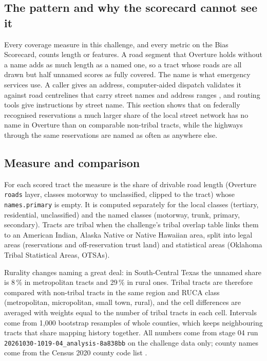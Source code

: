 \documentclass[11pt]{article}
\begin{document}
\subsection{The pattern and why the scorecard cannot see it}

Every coverage measure in this challenge, and every metric on the Bias
Scorecard, counts length or features. A road segment that Overture holds
without a name adds as much length as a named one, so a tract whose roads
are all drawn but half unnamed scores as fully covered. The name is what
emergency services use. A caller gives an address, computer-aided dispatch
validates it against road centrelines that carry street names and address
ranges \cite{nena006}, and routing tools give instructions by street name.
This section shows that on federally recognised reservations a much larger
share of the local street network has no name in Overture than on comparable
non-tribal tracts, while the highways through the same reservations are
named as often as anywhere else.

\subsection{Measure and comparison}

For each scored tract the measure is the share of drivable road length
(Overture \texttt{roads} layer, classes motorway to unclassified, clipped to
the tract) whose \texttt{names.primary} is empty. It is computed separately
for the local classes (tertiary, residential, unclassified) and the named
classes (motorway, trunk, primary, secondary). Tracts are tribal when the
challenge's tribal overlap table links them to an American Indian, Alaska
Native or Native Hawaiian area, split into legal areas (reservations and
off-reservation trust land) and statistical areas (Oklahoma Tribal
Statistical Areas, OTSAs).

Rurality changes naming a great deal: in South-Central Texas the unnamed
share is 8\,\% in metropolitan tracts and 29\,\% in rural ones. Tribal tracts
are therefore compared with non-tribal tracts in the same region and RUCA
class (metropolitan, micropolitan, small town, rural), and the cell
differences are averaged with weights equal to the number of tribal tracts
in each cell. Intervals come from 1,000 bootstrap resamples of whole
counties, which keeps neighbouring tracts that share mapping history
together. All numbers come from stage 04 run
\texttt{20261030-1019-04\_analysis-8a838bb} on the challenge data only;
county names come from the Census 2020 county code list \cite{countycodes}.
\end{document}

